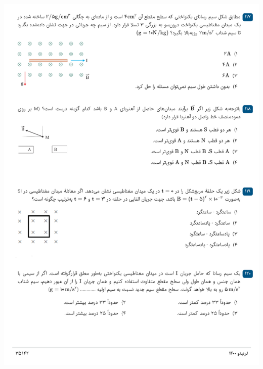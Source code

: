 \documentclass{book}
\begin{document}
\includegraphics[width=\textwidth]{"pages/35"}
\end{document}
